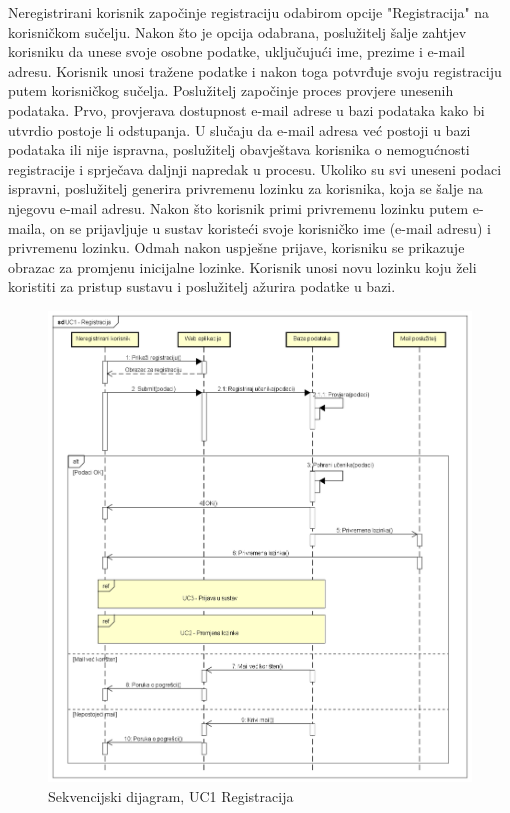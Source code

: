 Neregistrirani korisnik započinje registraciju odabirom opcije "Registracija" na korisničkom sučelju. Nakon što je opcija odabrana, poslužitelj šalje zahtjev korisniku da unese svoje osobne podatke, uključujući ime, prezime i e-mail adresu. Korisnik unosi tražene podatke i nakon toga potvrđuje svoju registraciju putem korisničkog sučelja. Poslužitelj započinje proces provjere unesenih podataka. Prvo, provjerava dostupnost e-mail adrese u bazi podataka kako bi utvrdio postoje li odstupanja. U slučaju da e-mail adresa već postoji u bazi podataka ili nije ispravna, poslužitelj obavještava korisnika o nemogućnosti registracije i sprječava daljnji napredak u procesu. Ukoliko su svi uneseni podaci ispravni, poslužitelj generira privremenu lozinku za korisnika, koja se šalje na njegovu e-mail adresu. Nakon što korisnik primi privremenu lozinku putem e-maila, on se prijavljuje u sustav koristeći svoje korisničko ime (e-mail adresu) i privremenu lozinku. Odmah nakon uspješne prijave, korisniku se prikazuje obrazac za promjenu inicijalne lozinke. Korisnik unosi novu lozinku koju želi koristiti za pristup sustavu i poslužitelj ažurira podatke u bazi.

\begin{figure}[htp]
	\includegraphics[scale=0.45]{dijagrami/UC1 - Registracija.png}
	\centering
	\caption{Sekvencijski dijagram, UC1 Registracija}
	\label{fig:uc-registracija}
\end{figure}

